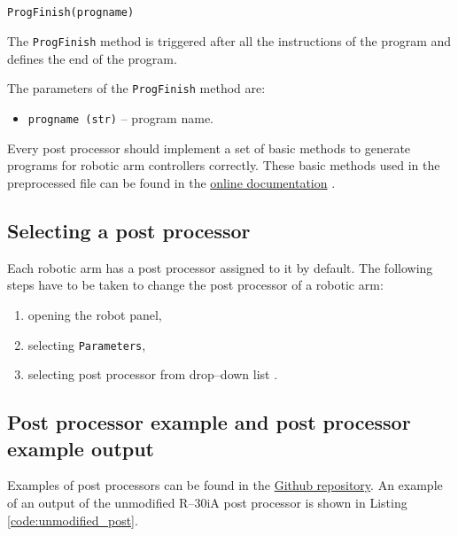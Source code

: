 \begin{verbatim}

ProgFinish(progname)

\end{verbatim}

The \texttt{ProgFinish} method is triggered after all the instructions of the program and defines the end of the program.


The parameters of the \texttt{ProgFinish} method are:

\begin{itemize}

\item \texttt{progname (str)} -- program name.

\end{itemize}


 Every post processor should implement a set of basic methods to generate programs for robotic arm controllers correctly. These basic  methods used in the preprocessed file can be found in the \href{https://robodk.com/doc/en/PythonAPI/postprocessor.html#post-processor-methods}{online documentation} \cite{postmethods}.


\subsection{Selecting a post processor}

Each robotic arm has a post processor assigned to it by default. The following steps have to be taken to change the post processor of a robotic arm:


\begin{enumerate}
    \item opening the robot panel,
    \item selecting \texttt{Parameters},
    \item selecting post processor from drop--down list \cite{selectpost}.
\end{enumerate}

\subsection{Post processor example and post processor example output}

Examples of post processors can be found in the \href{https://github.com/ros-industrial/robodk_postprocessors}{Github repository}. An example of an output of the unmodified R--30iA post processor is shown in Listing \ref{code:unmodified_post}.

